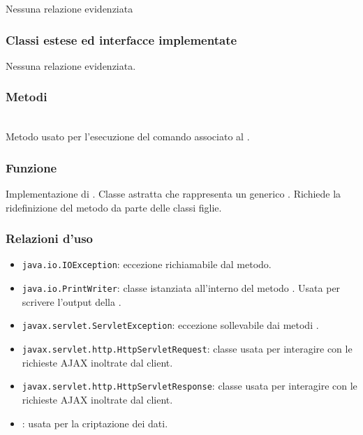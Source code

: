 Nessuna relazione evidenziata

\subsubsection*{Classi estese ed interfacce implementate}

Nessuna relazione evidenziata.

\subsubsection*{Metodi}
\begin{description}
	\item{}\\
	Metodo usato per l'esecuzione del comando associato al .
\end{description}


\subsubsection*{Funzione}
Implementazione di . Classe astratta che rappresenta un generico . Richiede la ridefinizione del metodo  da parte delle classi figlie.

\subsubsection*{Relazioni d'uso}
\begin{itemize}
	\item \texttt{java.io.IOException}: eccezione richiamabile dal metodo.
	\item \texttt{java.io.PrintWriter}: classe istanziata all'interno del metodo . Usata per scrivere l'output della .
	\item \texttt{javax.servlet.ServletException}: eccezione sollevabile dai metodi .
	\item \texttt{javax.servlet.http.HttpServletRequest}: classe usata per interagire con le richieste AJAX inoltrate dal client.
	\item \texttt{javax.servlet.http.HttpServletResponse}: classe usata per interagire con le richieste AJAX inoltrate dal client.
	\item {}: usata per la criptazione dei dati.
\end{itemize}

